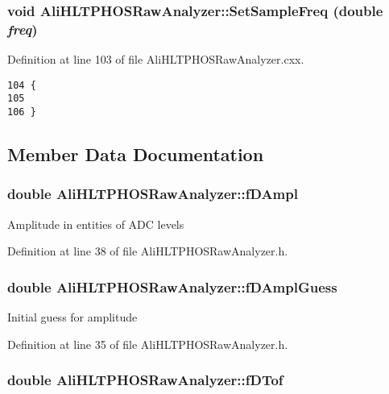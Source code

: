 \subsubsection{\setlength{\rightskip}{0pt plus 5cm}void Ali\-HLTPHOSRaw\-Analyzer::Set\-Sample\-Freq (double {\em freq})}\label{classAliHLTPHOSRawAnalyzer_AliHLTPHOSRawAnalyzerPeakFindera13}




Definition at line 103 of file Ali\-HLTPHOSRaw\-Analyzer.cxx.

\footnotesize\begin{verbatim}104 {
105 
106 }
\end{verbatim}\normalsize 




\subsection{Member Data Documentation}
\subsubsection{\setlength{\rightskip}{0pt plus 5cm}double {\bf Ali\-HLTPHOSRaw\-Analyzer::f\-DAmpl}\hspace{0.3cm}{\tt  [protected]}}\label{classAliHLTPHOSRawAnalyzer_AliHLTPHOSRawAnalyzerPeakFinderp6}


Amplitude in entities of ADC levels 

Definition at line 38 of file Ali\-HLTPHOSRaw\-Analyzer.h.
\subsubsection{\setlength{\rightskip}{0pt plus 5cm}double {\bf Ali\-HLTPHOSRaw\-Analyzer::f\-DAmpl\-Guess}\hspace{0.3cm}{\tt  [protected]}}\label{classAliHLTPHOSRawAnalyzer_AliHLTPHOSRawAnalyzerPeakFinderp3}


Initial guess for amplitude 

Definition at line 35 of file Ali\-HLTPHOSRaw\-Analyzer.h.
\subsubsection{\setlength{\rightskip}{0pt plus 5cm}double {\bf Ali\-HLTPHOSRaw\-Analyzer::f\-DTof}\hspace{0.3cm}{\tt  [protected]}}\label{classAliHLTPHOSRawAnalyzer_AliHLTPHOSRawAnalyzerPeakFinderp5}


